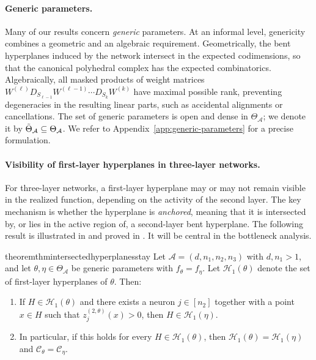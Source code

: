 \documentclass{article}
\theoremstyle{definition}
\newcommand{\architecture}{\mathcal{A}}
\newcommand{\paramspace}[1]{\Theta_{#1}}
\newcommand{\gparamspace}[1]{\Tilde{\Theta}_{#1}}
\newcommand{\complex}{\mathcal{C}}
\newcommand{\preactivation}[1]{z^{(#1)}}
\newcommand{\hyperplanes}[2]{\mathcal{H}_{#1}(#2)}
\begin{document}
\paragraph{Generic parameters.} 
Many of our results concern \emph{generic} parameters. At an informal level, genericity combines a
geometric and an algebraic requirement. Geometrically, the bent hyperplanes induced by the network
intersect in the expected codimensions, so that the canonical polyhedral complex has the expected
combinatorics. Algebraically, all %
masked products of weight matrices $W^{(\ell)}D_{S_{\ell-1}} W^{(\ell-1)}\cdots D_{S_k}W^{(k)}$ have maximal possible rank,
preventing degeneracies in the resulting linear parts, such as accidental alignments or
cancellations. The set of generic parameters is open and dense in $\paramspace{\architecture}$; we
denote it by $\gparamspace{\architecture} \subseteq \paramspace{\architecture}$. We refer to Appendix~\ref{app:generic-parameters} for a precise formulation.


\paragraph{Visibility of first-layer hyperplanes in three-layer networks.}
For three-layer networks, a first-layer hyperplane may or may not remain visible in the realized function,
depending on the activity of the second layer. 
The key mechanism is whether the hyperplane is \emph{anchored}, meaning that it is intersected by, or lies in
the active region of, a second-layer bent hyperplane.
The following result 
is illustrated in 
and proved in . It will be central in the bottleneck analysis.

\begin{restatable}{theorem}{thmintersectedhyperplanesstay} 
\label{thm:intersected_hyperplanes_stay} 
Let $\architecture = (d,n_1,n_2,n_3)$ with $d,n_1>1$, and let $\theta,\eta\in\paramspace{\architecture}$
be generic parameters with $f_\theta=f_\eta$. 
Let $\hyperplanes{1}{\theta}$ denote the set of first-layer hyperplanes of $\theta$.
Then:
\begin{enumerate}[leftmargin=*]
    \item If $H\in \hyperplanes{1}{\theta}$ and there exists a neuron $j\in[n_2]$ together with
    a point $x\in H$ such that $\preactivation{2,\theta}_j(x)>0$, then $H\in \hyperplanes{1}{\eta}$.
    \item In particular, if this holds for every $H\in \hyperplanes{1}{\theta}$, then
    $
    \hyperplanes{1}{\theta}=\hyperplanes{1}{\eta}
$ and $
    \complex_\theta=\complex_\eta.
    $
\end{enumerate}
\end{restatable} 
\end{document}
